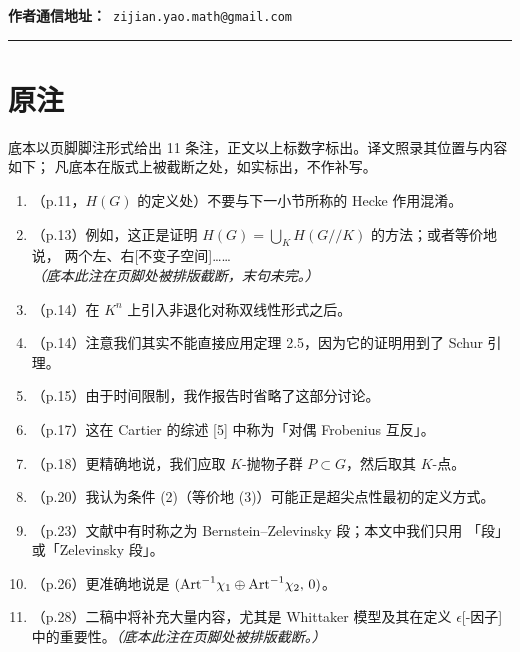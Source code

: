 \vspace{0.8em}
\noindent\textbf{作者通信地址：}\ \texttt{zijian.yao.math@gmail.com}

\bigskip
\hrule
\bigskip

\section*{原注}

底本以页脚脚注形式给出 11 条注，正文以上标数字标出。译文照录其位置与内容如下；
凡底本在版式上被截断之处，如实标出，不作补写。

\begin{enumerate}[label={\textsuperscript{\arabic*}},leftmargin=2.4em,itemsep=0.3em]
\item （p.11，$H(G)$ 的定义处）不要与下一小节所称的 Hecke 作用混淆。
\item （p.13）例如，这正是证明 $H(G)=\bigcup_K H(G/\!/K)$ 的方法；或者等价地说，
      两个左、右[不变子空间]……\emph{（底本此注在页脚处被排版截断，末句未完。）}
\item （p.14）在 $K^{n}$ 上引入非退化对称双线性形式之后。
\item （p.14）注意我们其实不能直接应用定理 2.5，因为它的证明用到了 Schur 引理。
\item （p.15）由于时间限制，我作报告时省略了这部分讨论。
\item （p.17）这在 Cartier 的综述 [5] 中称为「对偶 Frobenius 互反」。
\item （p.18）更精确地说，我们应取 $K$-抛物子群 $P\subset G$，然后取其 $K$-点。
\item （p.20）我认为条件 (2)（等价地 (3)）可能正是超尖点性最初的定义方式。
\item （p.23）文献中有时称之为 Bernstein--Zelevinsky 段；本文中我们只用
      「段」或「Zelevinsky 段」。
\item （p.26）更准确地说是 $(\mathrm{Art}^{-1}\chi_1\oplus\mathrm{Art}^{-1}\chi_2,\,0)$。
\item （p.28）二稿中将补充大量内容，尤其是 Whittaker 模型及其在定义
      $\epsilon$[-因子]中的重要性。\emph{（底本此注在页脚处被排版截断。）}
\end{enumerate}
